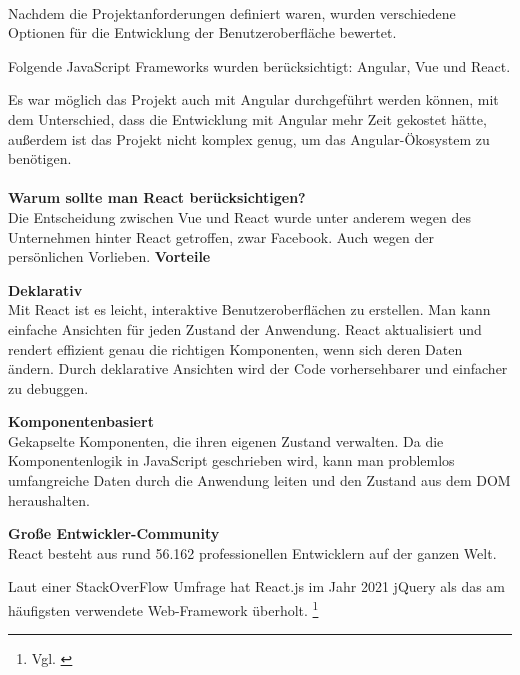 \paragraph{}

Nachdem die Projektanforderungen definiert waren, wurden verschiedene Optionen für die Entwicklung der Benutzeroberfläche bewertet.

Folgende JavaScript Frameworks wurden berücksichtigt: Angular, Vue und React.


Es war möglich das Projekt auch mit Angular durchgeführt werden können, mit dem Unterschied, dass die Entwicklung mit Angular mehr Zeit gekostet hätte, außerdem ist das Projekt nicht komplex genug, um das Angular-Ökosystem zu benötigen.


\paragraph{}
\textbf{Warum sollte man React berücksichtigen?}\\
Die Entscheidung zwischen Vue und React wurde unter anderem wegen des Unternehmen hinter React getroffen, zwar Facebook. Auch wegen der persönlichen Vorlieben.
\newline
\textbf{Vorteile} 
\newline

\textbf{Deklarativ} \\
Mit React ist es leicht, interaktive Benutzeroberflächen zu erstellen. Man kann einfache Ansichten für jeden Zustand der Anwendung. React aktualisiert und rendert effizient genau die richtigen Komponenten, wenn sich deren Daten ändern.
Durch deklarative Ansichten wird der Code vorhersehbarer und einfacher zu debuggen.
\newline

\textbf{Komponentenbasiert}\\
Gekapselte Komponenten, die ihren eigenen Zustand verwalten.
Da die Komponentenlogik in JavaScript geschrieben wird, kann man problemlos umfangreiche Daten durch die Anwendung leiten und den Zustand aus dem DOM heraushalten.
\newline

\textbf{Große Entwickler-Community}\\
React besteht aus rund 56.162 professionellen Entwicklern auf der ganzen Welt.

Laut einer StackOverFlow Umfrage hat React.js im Jahr 2021 jQuery als das am häufigsten verwendete Web-Framework überholt.
\footnote{ Vgl. \cite{SO01}}
\newline

